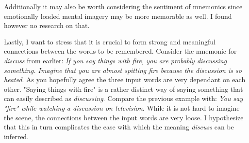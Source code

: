 Additionally it may also be worth considering the sentiment of mnemonics since emotionally loaded mental imagery may be more memorable as well. I found however no research on that.

Lastly, I want to stress that it is crucial to form strong and meaningful connections between the words to be remembered. Consider the mnemonic for \emph{discuss} from earlier: \emph{If you say things with fire, you are probably discussing something. Imagine that you are almost spitting fire because the discussion is so heated}. As you hopefully agree the three input words are very dependant on each other. "Saying things with fire" is a rather distinct way of saying something that can easily described as \emph{discussing}. Compare the previous example with: \emph{You say "fire" while watching a discussion on television}. While it is not hard to imagine the scene, the connections between the input words are very loose. I hypothesize that this in turn complicates the ease with which the meaning \emph{discuss} can be inferred.  